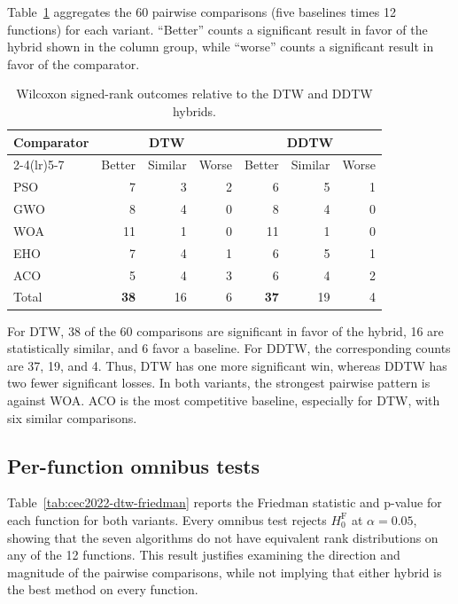 Table~\ref{tab:cec2022-dtw-pairwise-counts} aggregates the 60 pairwise
comparisons (five baselines times 12 functions) for each variant. ``Better''
counts a significant result in favor of the hybrid shown in the column group,
while ``worse'' counts a significant result in favor of the comparator.

\begin{table}[htbp]
\centering
\caption{Wilcoxon signed-rank outcomes relative to the DTW and DDTW hybrids.}
\label{tab:cec2022-dtw-pairwise-counts}
\begin{tabular}{lrrrrrr}
\toprule
Comparator & \multicolumn{3}{c}{DTW} & \multicolumn{3}{c}{DDTW}\\
\cmidrule(lr){2-4}\cmidrule(lr){5-7}
 & Better & Similar & Worse & Better & Similar & Worse\\
\midrule
PSO & 7 & 3 & 2 & 6 & 5 & 1\\
GWO & 8 & 4 & 0 & 8 & 4 & 0\\
WOA & 11 & 1 & 0 & 11 & 1 & 0\\
EHO & 7 & 4 & 1 & 6 & 5 & 1\\
ACO & 5 & 4 & 3 & 6 & 4 & 2\\
\midrule
Total & \textbf{38} & 16 & 6 & \textbf{37} & 19 & 4\\
\bottomrule
\end{tabular}
\end{table}

For DTW, 38 of the 60 comparisons are significant in favor of the hybrid, 16
are statistically similar, and 6 favor a baseline. For DDTW, the corresponding
counts are 37, 19, and 4. Thus, DTW has one more significant win, whereas DDTW
has two fewer significant losses. In both
variants, the strongest pairwise pattern is against WOA. ACO is the most
competitive baseline, especially for DTW, with six similar comparisons.

\subsection{Per-function omnibus tests}

Table~\ref{tab:cec2022-dtw-friedman} reports the Friedman statistic and p-value
for each function for both variants. Every omnibus test rejects $H_0^{\mathrm{F}}$ at
$\alpha=0.05$, showing that the seven algorithms do not have equivalent rank
distributions on any of the 12 functions. This result justifies examining the
direction and magnitude of the pairwise comparisons, while not implying that
either hybrid is the best method on every function.

